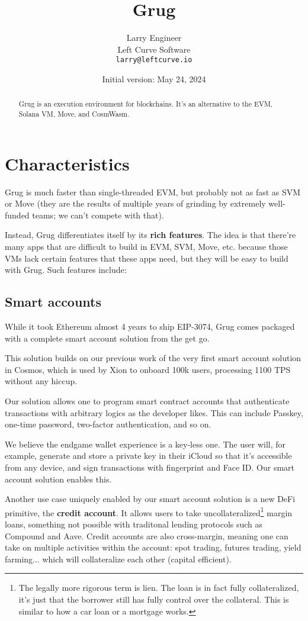 \documentclass{article}
\title{Grug}
\author{
  Larry Engineer \\
	Left Curve Software \\
	\texttt{larry@leftcurve.io} \\
}
\date{Initial version: May 24, 2024}
\begin{document}
\maketitle

\begin{abstract}
  Grug is an execution environment for blockchains. It's an alternative to the EVM, Solana VM, Move, and CosmWasm.
\end{abstract}

\section{Characteristics}

Grug is much faster than single-threaded EVM, but probably not as fast as SVM or Move (they are the results of multiple years of grinding by extremely well-funded teams; we can't compete with that).

Instead, Grug differentiates itself by its \textbf{rich features}. The idea is that there're many apps that are difficult to build in EVM, SVM, Move, etc. because those VMs lack certain features that these apps need, but they will be easy to build with Grug. Such features include:

\subsection{Smart accounts}

While it took Ethereum almost 4 years to ship EIP-3074,\supercite{eip3074} Grug comes packaged with a complete smart account solution from the get go.

This solution builds on our previous work of the very first smart account solution in Cosmos,\supercite{abstractaccount} which is used by Xion\supercite{xion} to onboard 100k users, processing 1100 TPS without any hiccup.

Our solution allows one to program smart contract accounts that authenticate transactions with arbitrary logics as the developer likes. This can include Passkey, one-time password, two-factor authentication, and so on.

We believe the endgame wallet experience is a key-less one. The user will, for example, generate and store a private key in their iCloud so that it's accessible from any device, and sign transactions with fingerprint and Face ID. Our smart account solution enables this.

Another use case uniquely enabled by our smart account solution is a new DeFi primitive, the \textbf{credit account}.\supercite{creditaccount} It allows users to take uncollateralized\footnote{The legally more rigorous term is lien.\supercite{lien} The loan is in fact fully collateralized, it's just that the borrower still has fully control over the collateral. This is similar to how a car loan or a mortgage works.} margin loans, something not possible with traditonal lending protocols such as Compound and Aave. Credit accounts are also cross-margin, meaning one can take on multiple activities within the account: spot trading, futures trading, yield farming... which will collateralize each other (capital efficient).
\end{document}
